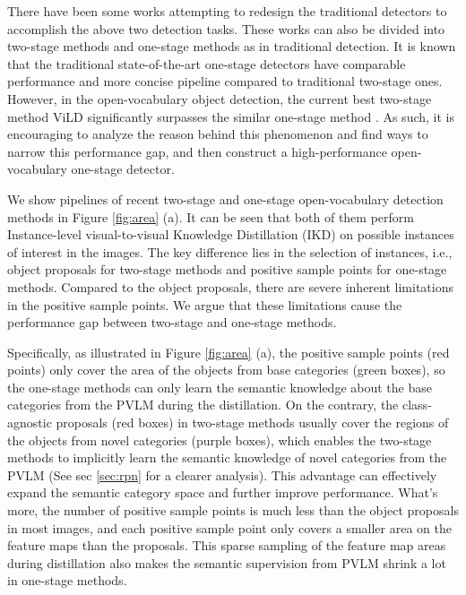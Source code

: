 \documentclass[10pt,twocolumn,letterpaper]{article}
\begin{document}
There have been some works attempting to redesign the traditional detectors to accomplish the above two detection tasks. These works can also be divided into two-stage \cite{bansal2018zero, li2019zero, zheng2021zero, zheng2020background, gu2021zero, zareian2021open} methods and one-stage \cite{rahman2020improved, zhao2020gtnet, zhu2020don ,xie2021zsd} methods as in traditional detection. It is known that the traditional state-of-the-art one-stage detectors have comparable performance and more concise pipeline compared to traditional two-stage ones. However, in the open-vocabulary object detection, the current best two-stage method ViLD \cite{gu2021zero} significantly surpasses the similar one-stage method \cite{xie2021zsd}. As such, it is encouraging to analyze the reason behind this phenomenon and find ways to narrow this performance gap, and then construct a high-performance open-vocabulary one-stage detector.





We show pipelines of recent two-stage and one-stage open-vocabulary detection methods in Figure \ref{fig:area} (a). It can be seen that both of them perform Instance-level visual-to-visual Knowledge Distillation (IKD) on possible instances of interest in the images. The key difference lies in the selection of instances, i.e., object proposals for two-stage methods and positive sample points for one-stage methods. Compared to the object proposals, there are severe inherent limitations in the positive sample points. We argue that these limitations cause the performance gap between two-stage and one-stage methods.


Specifically, as illustrated in Figure \ref{fig:area} (a), the positive sample points (red points) only cover the area of the objects from base categories (green boxes), so the one-stage methods can only learn the semantic knowledge about the base categories from the PVLM during the distillation. On the contrary, the class-agnostic proposals (red boxes) in two-stage methods usually cover the regions of the objects from novel categories (purple boxes), which enables the two-stage methods to implicitly learn the semantic knowledge of novel categories from the PVLM (See sec \ref{sec:rpn} for a clearer analysis).  
This advantage can effectively expand the semantic category space and further improve performance. What's more, the number of positive sample points is much less than the object proposals in most images, and each positive sample point only covers a smaller area on the feature maps than the proposals. This sparse sampling of the feature map areas during distillation also makes the semantic supervision from PVLM shrink a lot in one-stage methods.
\end{document}
